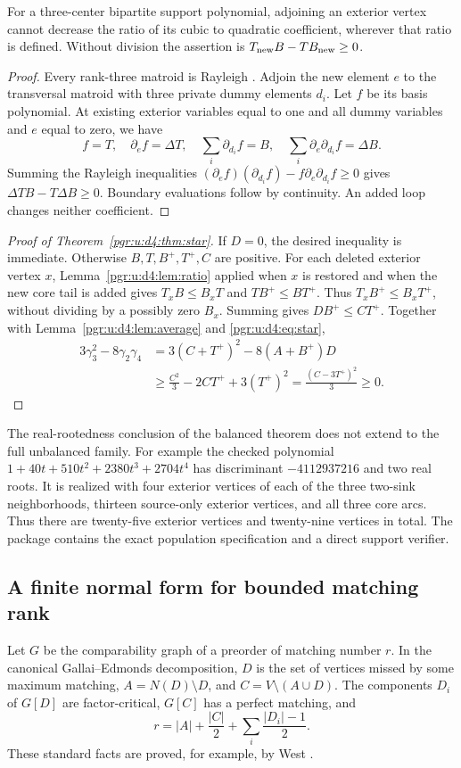 \documentclass[11pt]{article}
\numberwithin{equation}{section}
\theoremstyle{definition}\newtheorem{definition}[theorem]{Definition}\newtheorem{remark}[theorem]{Remark}
\begin{document}
\begin{lemma}\label{pgr:u:d4:lem:ratio}
For a three-center bipartite support polynomial, adjoining an exterior vertex cannot decrease the ratio of its cubic to quadratic coefficient, wherever that ratio is defined. Without division the assertion is
$T_{\rm new}B-TB_{\rm new}\ge0$.
\end{lemma}
\begin{proof}
Every rank-three matroid is Rayleigh \cite[Theorem 1.1]{WagnerR3}. Adjoin the new element $e$ to the transversal matroid with three private dummy elements $d_i$. Let $f$ be its basis polynomial. At existing exterior variables equal to one and all dummy variables and $e$ equal to zero, we have
\[
 f=T,\quad \partial_e f=\Delta T,\quad
 \sum_i\partial_{d_i}f=B,\quad
 \sum_i\partial_e\partial_{d_i}f=\Delta B.
\]
Summing the Rayleigh inequalities
$(\partial_e f)(\partial_{d_i}f)-f\partial_e\partial_{d_i}f\ge0$
gives $\Delta T B-T\Delta B\ge0$. Boundary evaluations follow by continuity. An added loop changes neither coefficient.
\end{proof}
\begin{proof}[Proof of Theorem~\ref{pgr:u:d4:thm:star}]
If $D=0$, the desired inequality is immediate. Otherwise $B,T,B^+,T^+,C$ are positive. For each deleted exterior vertex $x$, Lemma~\ref{pgr:u:d4:lem:ratio} applied when $x$ is restored and when the new core tail is added gives
$T_xB\le B_xT$ and $TB^+\le BT^+$. Thus $T_xB^+\le B_xT^+$, without dividing by a possibly zero $B_x$. Summing gives $DB^+\le CT^+$. Together with Lemma~\ref{pgr:u:d4:lem:average} and \eqref{pgr:u:d4:eq:star},
\begin{align*}
3\gamma_3^2-8\gamma_2\gamma_4
 &=3(C+T^+)^2-8(A+B^+)D\\
 &\ge \frac{C^2}{3}-2CT^++3(T^+)^2
 =\frac{(C-3T^+)^2}{3}\ge0.
\end{align*}
\end{proof}
The real-rootedness conclusion of the balanced theorem does not extend to the full unbalanced family. For example the checked polynomial
$1+40t+510t^2+2380t^3+2704t^4$ has discriminant $-4112937216$ and two real roots. It is realized with four exterior vertices of each of the three two-sink neighborhoods, thirteen source-only exterior vertices, and all three core arcs. Thus there are twenty-five exterior vertices and twenty-nine vertices in total. The package contains the exact population specification and a direct support verifier.


\subsection{A finite normal form for bounded matching rank}
Let $G$ be the comparability graph of a preorder of matching number $r$. In the canonical Gallai--Edmonds decomposition, $D$ is the set of vertices missed by some maximum matching, $A=N(D)\setminus D$, and $C=V\setminus(A\cup D)$. The components $D_i$ of $G[D]$ are factor-critical, $G[C]$ has a perfect matching, and
\begin{equation}\label{pgr:u:d4:eq:ge}
 r=|A|+\frac{|C|}{2}+\sum_i\frac{|D_i|-1}{2}.
\end{equation}
These standard facts are proved, for example, by West \cite{West}.
\end{document}
